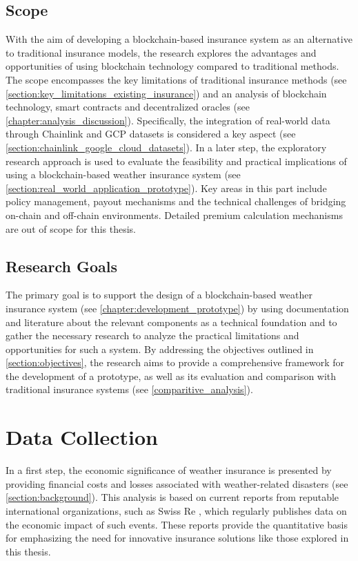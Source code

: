 \subsection{Scope}
With the aim of developing a blockchain-based insurance system as an alternative to traditional insurance models, the research explores the advantages and opportunities of using blockchain technology compared to traditional methods. The scope encompasses the key limitations of traditional insurance methods (see \cref{section:key_limitations_existing_insurance}) and an analysis of blockchain technology, smart contracts and decentralized oracles (see \cref{chapter:analysis_discussion}). Specifically, the integration of real-world data through Chainlink and GCP datasets is considered a key aspect (see \cref{section:chainlink_google_cloud_datasets}). In a later step, the exploratory research approach is used to evaluate the feasibility and practical implications of using a blockchain-based weather insurance system (see \cref{section:real_world_application_prototype}). Key areas in this part include policy management, payout mechanisms and the technical challenges of bridging on-chain and off-chain environments. Detailed premium calculation mechanisms are out of scope for this thesis.

\subsection{Research Goals}
The primary goal is to support the design of a blockchain-based weather insurance system (see \cref{chapter:development_prototype}) by using documentation and literature about the relevant components as a technical foundation and to gather the necessary research to analyze the practical limitations and opportunities for such a system. By addressing the objectives outlined in \cref{section:objectives}, the research aims to provide a comprehensive framework for the development of a prototype, as well as its evaluation and comparison with traditional insurance systems (see \cref{comparitive_analysis}).

\section{Data Collection}\label{section:data_collection}
In a first step, the economic significance of weather insurance is presented by providing financial costs and losses associated with weather-related disasters (see \cref{section:background}). This analysis is based on current reports from reputable international organizations, such as Swiss Re \autocite{swissre2017}, which regularly publishes data on the economic impact of such events. These reports provide the quantitative basis for emphasizing the need for innovative insurance solutions like those explored in this thesis.

